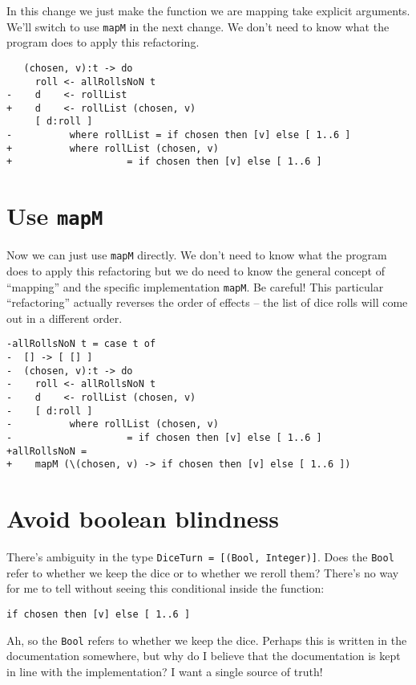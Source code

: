 In this change we just make the function we are mapping take explicit arguments. We'll switch to use \texttt{mapM} in the next change. 
We don't need to know what the program does to apply this refactoring.

\begin{verbatim}
   (chosen, v):t -> do
     roll <- allRollsNoN t
-    d    <- rollList
+    d    <- rollList (chosen, v)
     [ d:roll ]
-          where rollList = if chosen then [v] else [ 1..6 ]
+          where rollList (chosen, v)
+                    = if chosen then [v] else [ 1..6 ]
\end{verbatim}

\section{Use \texttt{mapM}}

Now we can just use \texttt{mapM} directly. 
We don't need to know what the program does to apply this refactoring but we do need to know the general concept of ``mapping'' and the specific implementation \texttt{mapM}. Be careful! This particular ``refactoring'' actually reverses the order of effects -- the list of dice rolls will come out in a different order.

\begin{verbatim}
-allRollsNoN t = case t of
-  [] -> [ [] ]
-  (chosen, v):t -> do
-    roll <- allRollsNoN t
-    d    <- rollList (chosen, v)
-    [ d:roll ]
-          where rollList (chosen, v)
-                    = if chosen then [v] else [ 1..6 ]
+allRollsNoN =
+    mapM (\(chosen, v) -> if chosen then [v] else [ 1..6 ])
\end{verbatim}


\section{Avoid boolean blindness}


There's ambiguity in the type \texttt{DiceTurn = [(Bool, Integer)]}. Does the \texttt{Bool} refer to whether we keep the dice or to whether we reroll them? There's no way for me to tell without seeing this conditional inside the function:

\begin{verbatim}
if chosen then [v] else [ 1..6 ]
\end{verbatim}
Ah, so the \texttt{Bool} refers to whether we keep the dice. Perhaps this is written in the documentation somewhere, but why do I believe that the documentation is kept in line with the implementation? I want a single source of truth!


